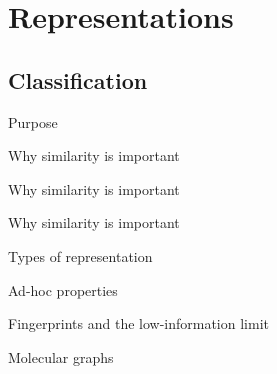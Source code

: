 
\section{Representations}
\subsection{Classification}
\begin{frame}[t]{Purpose}

\end{frame}
\begin{frame}[t]{Why similarity is important}

\end{frame}
\begin{frame}[t]{Why similarity is important}

\end{frame}
\begin{frame}[t]{Why similarity is important}

\end{frame}
\begin{frame}[t]{Types of representation}

\end{frame}
\begin{frame}[t]{Ad-hoc properties}

\end{frame}
\begin{frame}[t]{Fingerprints and the low-information limit}

\end{frame}
\begin{frame}[t]{Molecular graphs}

\end{frame}

